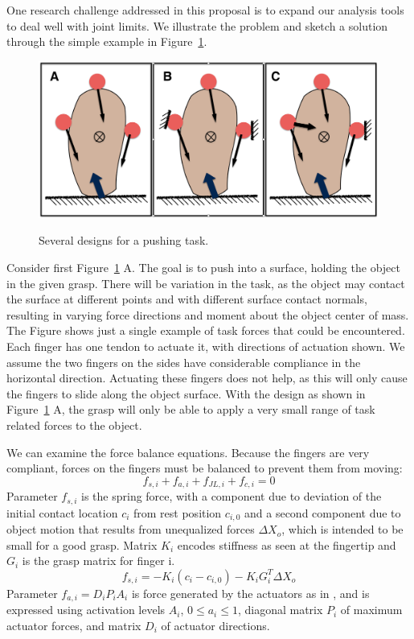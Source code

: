 One research challenge addressed in this proposal is to expand our analysis tools to deal well with joint limits.   We illustrate the problem and sketch a solution through the simple example in Figure~\ref{PushExample}.   
\begin{figure}
{\includegraphics[width=1.0\linewidth]{./figs/pushExample.png}}
\vspace*{-0.2in}
\caption[]{\small Several designs for a pushing task.}
\label{PushExample}
\end{figure}
Consider first Figure~\ref{PushExample} A.     The goal is to push into a surface, holding the object in the given grasp.   There will be variation in the task, as the object may contact the surface at different points and with different surface contact normals, resulting in varying force directions and moment about the object center of mass.   The Figure shows just a single example of task forces that could be encountered.    Each finger has one tendon to actuate it, with directions of actuation shown.    We assume the two fingers on the sides have considerable compliance in the horizontal direction.   Actuating these fingers does not help, as this will only cause the fingers to slide along the object surface.    With the design as shown in Figure~\ref{PushExample} A, the grasp will only be able to apply a very small range of task related forces to the object.



We can examine the force balance equations.   Because the fingers are very compliant, forces on the fingers must be balanced to prevent them from moving:
\begin{equation}
    f_{s, i} +     f_{a, i} +     f_{JL, i} +     f_{c, i} = 0
\end{equation}
Parameter $f_{s, i}$ is the spring force, with a component due to deviation of the initial contact location $c_i$ from rest position $c_{i, 0}$ and a second component due to object motion that results from unequalized forces $\Delta X_o$, which is intended to be small for a good grasp.   Matrix $K_i$ encodes stiffness as seen at the fingertip and $G_i$ is the grasp matrix for finger i.
\begin{equation}
 f_{s, i} = -K_i ( c_i - c_{i, 0}) - K_i G^T_i \Delta X_o
\end{equation}
Parameter $f_{a, i} = D_i P_i A_i$ is force generated by the actuators as in \cite{Li:graspDB07}, and is expressed using activation levels $A_i$, $0 \leq a_i \leq 1$, diagonal matrix $P_i$ of maximum actuator forces, and matrix $D_i$ of actuator directions.

